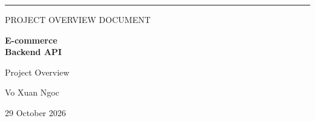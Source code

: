 \documentclass[11pt,a4paper,oneside]{report}
\begin{document}
\hypersetup{pageanchor=false}
\begin{titlepage}
\thispagestyle{empty}
{\color{navy}\rule{\textwidth}{2pt}}
\vspace{18mm}
{\Large PROJECT OVERVIEW DOCUMENT\par}
\vspace{8mm}
{\Huge\bfseries\color{navy} E-commerce\\[4pt] Backend API\par}
\vspace{7mm}
{\LARGE Project Overview\par}
\vspace{10mm}
{\large Vo Xuan Ngoc\par}
\vspace{6mm}
{\large 29 October 2026\par}
\vfill
\end{titlepage}
\hypersetup{pageanchor=true}
\tableofcontents
\clearpage{}






\appendix

\end{document}
